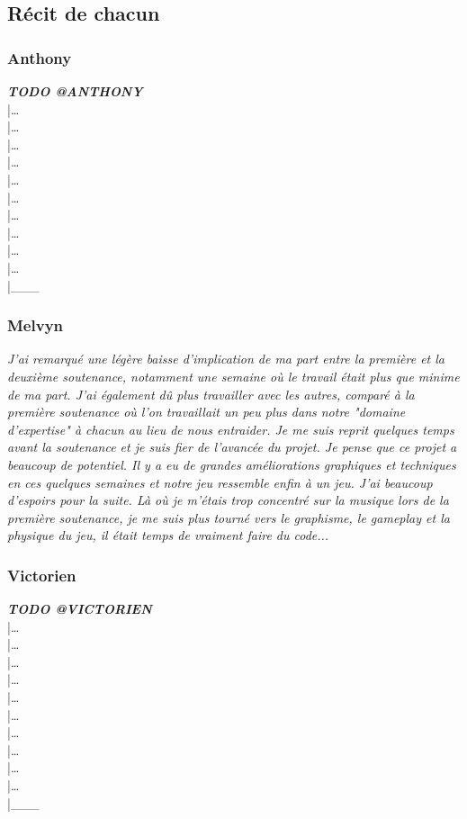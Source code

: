 \documentclass[12pt,a4paper]{article}
\begin{document}
        \subsection{Récit de chacun}
            \subsubsection{Anthony}
                \textit{\bfseries TODO @ANTHONY}\\
                |\dots\\|\dots\\|\dots\\|\dots\\|\dots\\|\dots\\|\dots\\|\dots\\|\dots\\|\dots\\|\_\_\_\\

            \subsubsection{Melvyn}
                \textit{J'ai remarqué une légère baisse d'implication de ma part entre la 
                première et la deuxième soutenance, notamment une semaine où le 
                travail était plus que minime de ma part. J'ai également dû plus 
                travailler avec les autres, comparé à la première soutenance où l'on
                travaillait un peu plus dans notre "domaine d'expertise" à chacun 
                au lieu de nous entraider. Je me suis reprit quelques temps avant la
                soutenance et je suis fier de l'avancée du projet. Je pense que ce projet
                a beaucoup de potentiel. Il y a eu de grandes améliorations graphiques et
                techniques en ces quelques semaines et notre jeu ressemble enfin à un jeu.
                J'ai beaucoup d'espoirs pour la suite. Là où je m'étais trop concentré sur
                la musique lors de la première soutenance, je me suis plus tourné vers
                le graphisme, le gameplay et la physique du jeu, il était temps de vraiment
                faire du code...}

            \subsubsection{Victorien}
                \textit{\bfseries TODO @VICTORIEN}\\
                |\dots\\|\dots\\|\dots\\|\dots\\|\dots\\|\dots\\|\dots\\|\dots\\|\dots\\|\dots\\|\_\_\_\\
\end{document}
